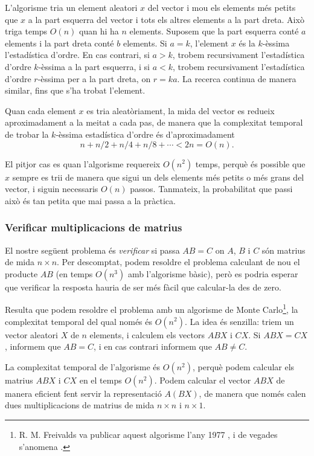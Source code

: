 L'algorisme tria un element aleatori $x$ del vector i mou els elements
més petits que $x$ a la part esquerra del vector i tots els altres
elements a la part dreta. Això triga temps $O(n)$ quan hi ha $n$
elements. Suposem que la part esquerra conté $a$ elements i la part
dreta conté $b$ elements. Si $a=k$, l'element $x$ és la $k$-èssima
l'estadística d'ordre. En cas contrari, si $a>k$, trobem recursivament
l'estadística d'ordre $k$-èssima a la part esquerra, i si $a<k$,
trobem recursivament l'estadística d'ordre $r$-èssima per a la part
dreta, on $r=ka$. La recerca continua de manera similar, fins que s'ha
trobat l'element.

Quan cada element $x$ es tria aleatòriament, la mida del vector es
redueix aproximadament a la meitat a cada pas, de manera que la
complexitat temporal de trobar la $k$-èssima estadística d'ordre és
d'aproximadament
\[n+n/2+n/4+n/8+\cdots < 2n = O(n).\]


El pitjor cas es quan l'algorisme requereix $O(n^2)$ temps, perquè és
possible que $x$ sempre es trii de manera que sigui un dels elements
més petits o més grans del vector, i siguin necessaris $O(n)$
passos. Tanmateix, la probabilitat que passi això és tan petita que
mai passa a la pràctica.

\subsubsection{Verificar multiplicacions de matrius}


El nostre següent problema és \emph{verificar} si passa $AB=C$ on $A$,
$B$ i $C$ són matrius de mida $n \times n$. Per descomptat, podem
resoldre el problema calculant de nou el producte $AB$ (en temps
$O(n^3)$ amb l'algorisme bàsic), però es podria esperar que verificar
la resposta hauria de ser més fàcil que calcular-la des de zero.

Resulta que podem resoldre el problema amb un algorisme de
Monte Carlo\footnote{R. M. Freivalds va publicar aquest algorisme
  l'any 1977 \cite{fre77}, i de vegades s'anomena  .}, la complexitat temporal
del qual només és $O(n^2)$. La idea és senzilla: triem un vector
aleatori $X$ de $n$ elements, i calculem els vectors $ABX$ i $CX$. Si
$ABX=CX$, informem que $AB=C$, i en cas contrari informem que $AB \neq
C$.

La complexitat temporal de l'algorisme és $O(n^2)$, perquè podem
calcular els matrius $ABX$ i $CX$ en el temps $O(n^2)$. Podem calcular
el vector $ABX$ de manera eficient fent servir la representació
$A(BX)$, de manera que només calen dues multiplicacions de matrius de
mida $n \times n$ i $n \times 1$.

